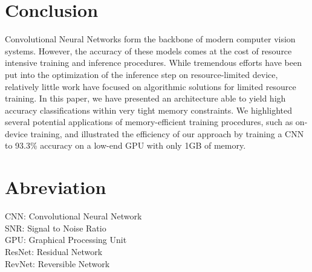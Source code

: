 \documentclass[twocolumn]{bmcart}
\begin{document}
\section{Conclusion}

Convolutional Neural Networks form the backbone of modern computer vision systems.
However, the accuracy of these models comes at the cost of resource intensive training and inference procedures.
While tremendous efforts have been put into the optimization of the inference step on resource-limited device,
relatively little work have focused on algorithmic solutions for limited resource training.
In this paper, we have presented an architecture able to yield high accuracy classifications within very tight memory constraints.
We highlighted several potential applications of memory-efficient training procedures, such as on-device training,
and illustrated the efficiency of our approach by training a CNN to 93.3\% accuracy on a low-end GPU with only 1GB of memory.

\section*{Abreviation}

CNN: Convolutional Neural Network  \\
SNR: Signal to Noise Ratio \\
GPU: Graphical Processing Unit \\
ResNet: Residual Network \\
RevNet: Reversible Network
\end{document}
